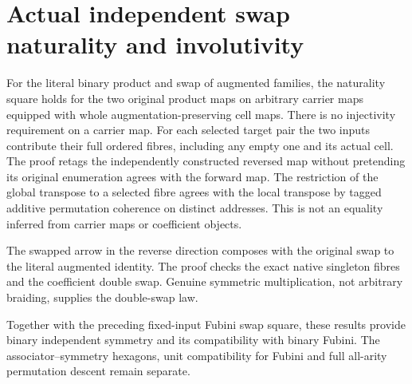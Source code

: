 \documentclass{article}
\begin{document}
\section*{Actual independent swap naturality and involutivity}
For the literal binary product and swap of augmented families,
the naturality square holds for the two original product maps
on arbitrary carrier maps equipped with whole augmentation-preserving
cell maps. There is no injectivity requirement on a carrier map.
For each selected target pair the two inputs contribute their
full ordered fibres, including any empty one and its actual cell.
The proof retags the independently constructed reversed map
without pretending its original enumeration agrees with the
forward map. The restriction of the global transpose to a
selected fibre agrees with the local transpose by tagged
additive permutation coherence on distinct addresses. This is
not an equality inferred from carrier maps or coefficient objects.

The swapped arrow in the reverse direction composes with the
original swap to the literal augmented identity. The proof
checks the exact native singleton fibres and the coefficient
double swap. Genuine symmetric multiplication, not arbitrary
braiding, supplies the double-swap law.

Together with the preceding fixed-input Fubini swap square,
these results provide binary independent symmetry and its
compatibility with binary Fubini. The associator--symmetry
hexagons, unit compatibility for Fubini and full all-arity
permutation descent remain separate.
\end{document}
